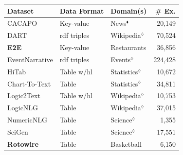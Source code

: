 {\begin{table}[t]
  \centering\small
  \begin{tabular}{@{}lllr@{}}
    \toprule
    \textbf{Dataset}                                                                           & \textbf{Data Format} & \textbf{Domain(s)}      & \textbf{\# Ex.} \\  \midrule
    CACAPO \cite{vanderleeCACAPODatasetMultilingual2020}                                       & Key-value            & News$^\blacklozenge$    & 20,149          \\
    DART \cite{nan2021dart}                                                                    & \acs{rdf} triples    & Wikipedia$^\lozenge$    & 70,524          \\
    \textbf{E2E} \cite{dusekSemanticNoiseMatters2019,dusekEvaluatingStateoftheartEndtoEnd2020} & Key-value            & Restaurants             & 36,856          \\
    EventNarrative \cite{colas2021eventnarrative}                                              & \acs{rdf} triples    & Events$^\lozenge$       & 224,428         \\
    HiTab \cite{chengHiTabHierarchicalTable2021}                                               & Table w/hl           & Statistics$^\lozenge$   & 10,672          \\
    Chart-To-Text \cite{kantharajCharttoTextLargeScaleBenchmark2022}                           & Table                & Statistics$^\lozenge$   & 34,811          \\
    Logic2Text \cite{chenLogic2TextHighFidelityNatural2020}                                    & Table w/hl           & Wikipedia$^\lozenge$    & 10,753          \\
    LogicNLG \cite{chenLogicalNaturalLanguage2020}                                             & Table                & Wikipedia$^\lozenge$    & 37,015          \\
    NumericNLG \cite{suadaaTabletoTextGenerationNumerical2021}                                 & Table                & Science$^\lozenge$      & 1,355           \\
    SciGen \cite{moosaviLearningReasonText2021}                                                & Table                & Science$^\lozenge$      & 17,551          \\
    \textbf{Rotowire} \cite{wiseman2017challenges}                                             & Table                & Basketball              & 6,150           \\

\end{tabular}
\end{table}}
